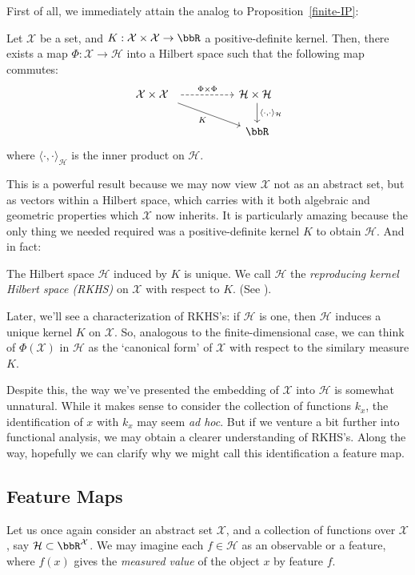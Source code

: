 \documentclass[twoside,11pt]{homework}
\begin{document}
\begin{multicols}{2}
First of all, we immediately attain the analog to Proposition~\ref{finite-IP}:

\begin{proposition}[Moore]
  Let $\mathcal{X}$ be a set, and $K: \mathcal{X} \times \mathcal{X} \to \bbR$ a positive-definite kernel. Then, there exists a map $\Phi: \mathcal{X} \to \mathcal{H}$ into a Hilbert space such that the following map commutes:
    \[\begin{tikzcd}
\mathcal{X} \times \mathcal{X}\ \  \arrow[dashed, rr, "\Phi \times \Phi"] \arrow[drr, "K"'] & & \mathcal{H}\times \mathcal{H} \ \arrow[d, "{\langle\cdot,\cdot \rangle_\mathcal{H}}"] \\
& & \bbR
\end{tikzcd}
    \]
    where $\langle \cdot, \cdot\rangle_\mathcal{H}$ is the inner product on $\mathcal{H}$.
\end{proposition}
This is a powerful result because we may now view $\mathcal{X}$ not as an abstract set, but as vectors within a Hilbert space, which carries with it both algebraic and geometric properties which $\mathcal{X}$ now inherits. It is particularly amazing because the only thing we needed required was a positive-definite kernel $K$ to obtain $\mathcal{H}$. And in fact:
\begin{fact}
  The Hilbert space $\mathcal{H}$ induced by $K$ is unique. We call $\mathcal{H}$ the \emph{reproducing kernel Hilbert space (RKHS)} on $\mathcal{X}$ with respect to $K$. (See \cite[Prop 3.3]{P2009}).
\end{fact}

Later, we'll see a characterization of RKHS's: if $\mathcal{H}$ is one, then $\mathcal{H}$ induces a unique kernel $K$ on $\mathcal{X}$. So, analogous to the finite-dimensional case, we can think of $\Phi(\mathcal{X})$ in $\mathcal{H}$ as the `canonical form' of $\mathcal{X}$ with respect to the similary measure $K$.



Despite this, the way we've presented the embedding of $\mathcal{X}$ into $\mathcal{H}$ is somewhat unnatural. While it makes sense to consider the collection of functions $k_x$, the identification of $x$ with $k_x$ may seem \emph{ad hoc}. But if we venture a bit further into functional analysis, we may obtain a clearer understanding of RKHS's. Along the way, hopefully we can clarify why we might call this identification a feature map.

\subsection{Feature Maps}
Let us once again consider an abstract set $\mathcal{X}$, and a collection of functions over $\mathcal{X}$, say $\mathcal{H} \subset \bbR^\mathcal{X}$. We may imagine each $f \in \mathcal{H}$ as an observable or a feature, where $f(x)$ gives the \emph{measured value} of the object $x$ by feature $f$.


\end{multicols}
\end{document}
